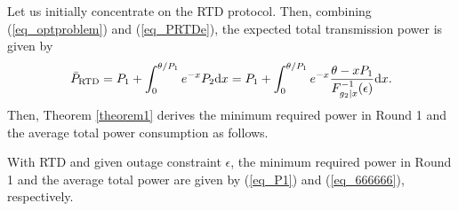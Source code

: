 Let us initially concentrate on the RTD protocol. Then,  combining (\ref{eq_optproblem}) and (\ref{eq_PRTDe}), the expected total transmission power  is given by
\begin{align}\label{eq_barP}
    \Bar{P}_\text{RTD} = P_1 + \int_0^{\theta/P_1} e^{- x}P_2\text{d}x= P_1 + \int_0^{\theta/P_1} e^{- x}\frac{\theta-x P_1}{F_{g_2|x}^{-1}(\epsilon)}\text{d}x.
\end{align}
Then, Theorem \ref{theorem1} derives the minimum required power  in Round 1 and the average total power consumption as follows. 



\begin{theorem}\label{theorem1}
With RTD and given outage constraint $\epsilon$, the minimum required power in Round 1 and the average total power are given by (\ref{eq_P1}) and (\ref{eq_666666}), respectively. 
\end{theorem}
